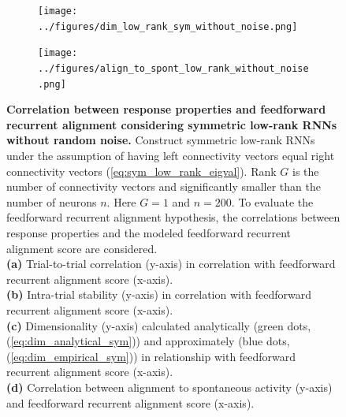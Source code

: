 \documentclass[11pt]{article}
\begin{document}
\begin{figure}[H]
\begin{subfigure}[b]{0.45\textwidth}
			\end{subfigure}
			\newline
			\begin{subfigure}[b]{0.45\textwidth}
				\texttt{[image: ../figures/dim\_low\_rank\_sym\_without\_noise.png]}
				\caption{}
			\end{subfigure}
			\hfill
			\begin{subfigure}[b]{0.45\textwidth}
				\texttt{[image: ../figures/align\_to\_spont\_low\_rank\_without\_noise.png]}
				\caption{}
			\end{subfigure}
			\caption{\textbf{Correlation between response properties and feedforward recurrent alignment considering symmetric low-rank RNNs without random noise.} Construct symmetric low-rank RNNs under the assumption of having left connectivity vectors equal right connectivity vectors (\ref{eq:sym_low_rank_eigval}). Rank $G$ is the number of connectivity vectors and significantly smaller than the number of neurons $n$. Here $G = 1$ and $n = 200$. To evaluate the feedforward recurrent alignment hypothesis, the correlations between response properties and the modeled feedforward recurrent alignment score are considered. \\
			\textbf{(a)} Trial-to-trial correlation (y-axis) in correlation with feedforward recurrent alignment score (x-axis).\\
			\textbf{(b)} Intra-trial stability (y-axis) in correlation with feedforward recurrent alignment score (x-axis).\\
			\textbf{(c)} Dimensionality (y-axis) calculated analytically (green dots, (\ref{eq:dim_analytical_sym})) and approximately (blue dots, (\ref{eq:dim_empirical_sym})) in relationship with feedforward recurrent alignment score (x-axis).\\
			\textbf{(d)} Correlation between alignment to spontaneous activity (y-axis) and feedforward recurrent alignment score (x-axis).}
		
			\label{fig:ttc_its_low_rank_sym_no_noise}
		\end{figure}
	
\end{document}
